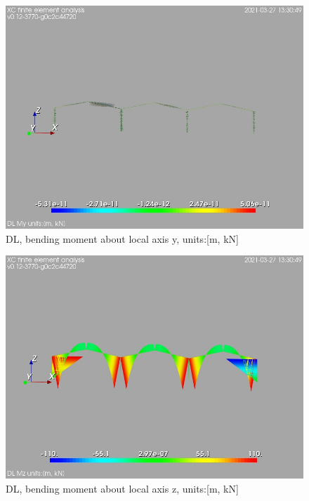 \begin{figure}
\begin{center}
\includegraphics[width=\linewidth]{calc_results/sole_zeinali/text/graphics/resSimplLC/DLallMemberSetMy}
\caption{DL, bending moment about local axis y, units:[m, kN]}
\end{center}
\end{figure}
\begin{figure}
\begin{center}
\includegraphics[width=\linewidth]{calc_results/sole_zeinali/text/graphics/resSimplLC/DLallMemberSetMz}
\caption{DL, bending moment about local axis z, units:[m, kN]}
\end{center}
\end{figure}
